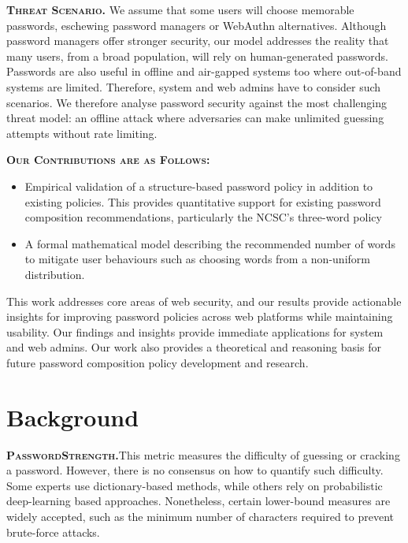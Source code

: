 \textbf{\textsc{Threat Scenario.}} We assume that some users will choose memorable passwords, eschewing password managers or WebAuthn alternatives. Although password managers offer stronger security, our model addresses the reality that many users, from a broad population, will rely on human-generated passwords. Passwords are also useful in offline and air-gapped systems too where out-of-band systems are limited. Therefore, system and web admins have to consider such scenarios. We therefore analyse password security against the most challenging threat model: an offline attack where adversaries can make unlimited guessing attempts without rate limiting.
\vspace*{0.25cm}

\textbf{\textsc{Our Contributions are as Follows:}}
\begin{itemize}
    \item Empirical validation of a structure-based password policy in addition to existing policies. This provides quantitative support for existing password composition recommendations, particularly the NCSC's three-word policy
    \item A formal mathematical model describing the recommended number of words to mitigate user behaviours such as choosing words from a non-uniform distribution.
\end{itemize}

\vspace*{0.25cm}

This work addresses core areas of web security, and our results provide actionable insights for improving password policies across web platforms while maintaining usability. Our findings and insights provide immediate applications for system and web admins. Our work also provides a theoretical and reasoning basis for future password composition policy development and research.

\newpage
\section{Background}
\label{sec::chp4::background}

\textbf{\textsc{Password\;Strength.}}\;This metric measures the difficulty of guessing or cracking a password. However, there is no consensus on how to quantify such difficulty. Some experts use dictionary-based methods, while others rely on probabilistic deep-learning based approaches. Nonetheless, certain lower-bound measures are widely accepted, such as the minimum number of characters required to prevent brute-force attacks.

